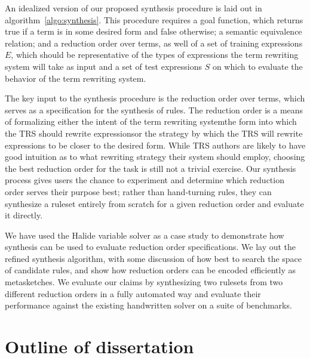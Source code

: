 An idealized version of our proposed synthesis procedure is laid out in algorithm~\ref{algo:synthesis}. This procedure requires a goal function, which returns true if a term is in some desired form and false otherwise; a semantic equivalence relation; and a reduction order over terms, as well of a set of training expressions $E$, which should be representative of the types of expressions the term rewriting system will take as input and a set of test expressions $S$ on which to evaluate the behavior of the term rewriting system.

The key input to the synthesis procedure is the reduction order over terms, which serves as a specification for the synthesis of rules. The reduction order is a means of formalizing either the intent of the term rewriting system\textemdash the form into which the TRS should rewrite expressions\textemdash or the strategy by which the TRS will rewrite expressions to be closer to the desired form. While TRS authors are likely to have good intuition as to what rewriting strategy their system should employ, choosing the best reduction order for the task is still not a trivial exercise. Our synthesis process gives users the chance to experiment and determine which reduction order serves their purpose best; rather than hand-turning rules, they can synthesize a ruleset entirely from scratch for a given reduction order and evaluate it directly.

We have used the Halide variable solver as a case study to demonstrate how synthesis can be used to evaluate reduction order specifications. We lay out the refined synthesis algorithm, with some discussion of how best to search the space of candidate rules, and show how reduction orders can be encoded efficiently as metasketches. We evaluate our claims by synthesizing two rulesets from two different reduction orders in a fully automated way and evaluate their performance against the existing handwritten solver on a suite of benchmarks.

\section{Outline of dissertation}

